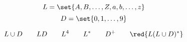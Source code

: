 \begin{frame}{}
  \[
    L = \set{A, B, \dots, Z, a, b, \dots, z}
  \]
  \[
    D = \set{0, 1, \dots, 9}
  \]

  \pause
  \[
    L \cup D \qquad LD \qquad L^4 \qquad L^{\ast} \qquad D^{+}
    \qquad \red{L(L \cup D)^{\ast}}
  \]
\end{frame}
